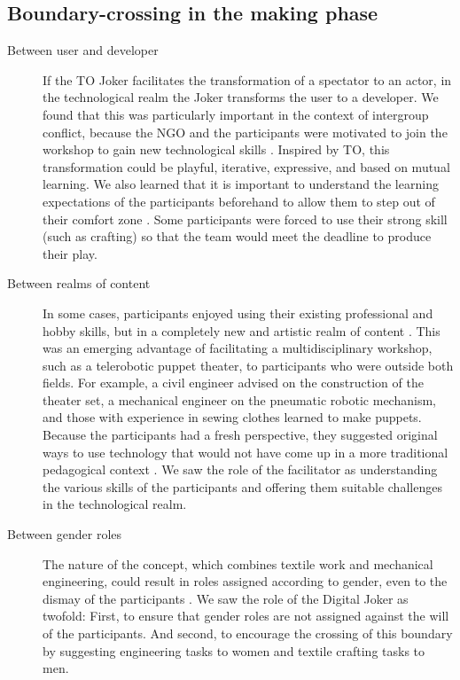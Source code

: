 \documentclass[dissertation,math,vertlayout,pdfa,colorlinks]{aaltoseries}
\begin{document}
\subsection{Boundary-crossing in the making phase}
\begin{description}
   \item[Between user and developer] If the TO Joker facilitates the transformation of a spectator to an actor, in the technological realm the Joker transforms the user to a developer. We found that this was particularly important in the context of intergroup conflict, because the NGO and the participants were motivated to join the workshop to gain new technological skills \cite[p. 19]{peledTeleroboticTheaterOppressed2025}. Inspired by TO, this transformation could be playful, iterative, expressive, and based on mutual learning. We also learned that it is important to understand the learning expectations of the participants beforehand to allow them to step out of their comfort zone \cite[p. 18]{peledTeleroboticTheaterOppressed2025}. Some participants were forced to use their strong skill (such as crafting) so that the team would meet the deadline to produce their play.
   \item[Between realms of content] In some cases, participants enjoyed using their existing professional and hobby skills, but in a completely new and artistic realm of content \cite[p. 18]{peledTeleroboticTheaterOppressed2025}. This was an emerging advantage of facilitating a multidisciplinary workshop, such as a telerobotic puppet theater, to participants who were outside both fields. For example, a civil engineer advised on the construction of the theater set, a mechanical engineer on the pneumatic robotic mechanism, and those with experience in sewing clothes learned to make puppets. Because the participants had a fresh perspective, they suggested original ways to use technology that would not have come up in a more traditional pedagogical context \cite[p. 18]{peledTeleroboticTheaterOppressed2025}. We saw the role of the facilitator as understanding the various skills of the participants and offering them suitable challenges in the technological realm.
   \item[Between gender roles] The nature of the concept, which combines textile work and mechanical engineering, could result in roles assigned according to gender, even to the dismay of the participants \cite[p. 19]{peledTeleroboticTheaterOppressed2025}. We saw the role of the Digital Joker as twofold: First, to ensure that gender roles are not assigned against the will of the participants. And second, to encourage the crossing of this boundary by suggesting engineering tasks to women and textile crafting tasks to men.

\end{description}
\end{document}
